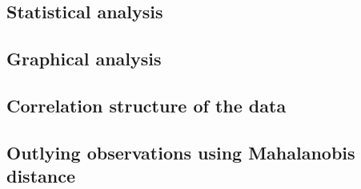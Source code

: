 \subsection{Statistical analysis}

\subsection{Graphical analysis}

\subsection{Correlation structure of the data}

\subsection{Outlying observations using Mahalanobis distance}
